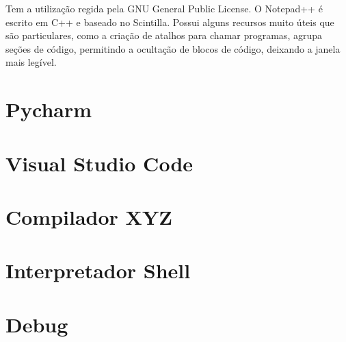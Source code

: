 	Tem a utilização regida pela GNU General Public License. O Notepad++ é escrito em C++ e baseado no Scintilla. Possui alguns recursos muito úteis que são particulares, como a criação de atalhos para chamar programas, agrupa seções de código, permitindo a ocultação de blocos de código, deixando a janela mais legível.
	
     \section{Pycharm}
    
    \section{Visual Studio Code}
    
    
    \section{Compilador XYZ}


    \section{Interpretador Shell}

   
    \section{Debug}
     